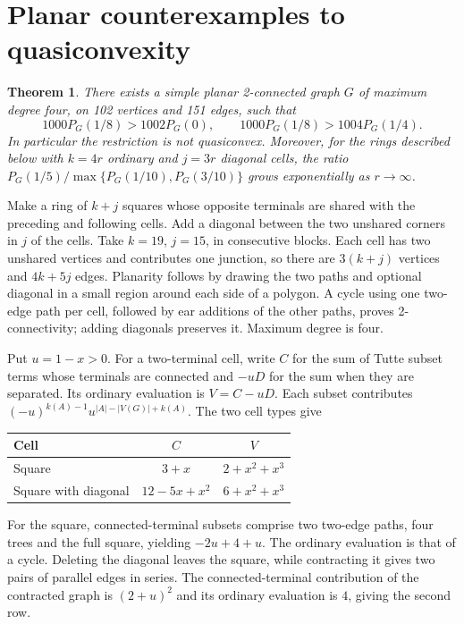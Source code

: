 \documentclass[11pt]{article}
\newtheorem{theorem}{Theorem}
\begin{document}
\section{Planar counterexamples to quasiconvexity}
\begin{theorem}\label{thm:planar}
There exists a simple planar 2-connected graph $G$ of maximum degree four, on 102 vertices and 151 edges, such that
\[
1000P_G(1/8)>1002P_G(0),\qquad 1000P_G(1/8)>1004P_G(1/4).
\]
In particular the restriction is not quasiconvex. Moreover, for the rings described below with $k=4r$ ordinary and $j=3r$ diagonal cells, the ratio $P_G(1/5)/\max\{P_G(1/10),P_G(3/10)\}$ grows exponentially as $r\to\infty$.
\end{theorem}
Make a ring of $k+j$ squares whose opposite terminals are shared with the preceding and following cells. Add a diagonal between the two unshared corners in $j$ of the cells. Take $k=19$, $j=15$, in consecutive blocks. Each cell has two unshared vertices and contributes one junction, so there are $3(k+j)$ vertices and $4k+5j$ edges. Planarity follows by drawing the two paths and optional diagonal in a small region around each side of a polygon. A cycle using one two-edge path per cell, followed by ear additions of the other paths, proves 2-connectivity; adding diagonals preserves it. Maximum degree is four.
\begin{center}
\end{center}
Put $u=1-x>0$. For a two-terminal cell, write $C$ for the sum of Tutte subset terms whose terminals are connected and $-uD$ for the sum when they are separated. Its ordinary evaluation is $V=C-uD$. Each subset contributes $(-u)^{k(A)-1}u^{|A|-|V(G)|+k(A)}$. The two cell types give
\begin{center}
\begin{tabular}{lcc}\toprule
Cell & $C$ & $V$\\\midrule
Square & $3+x$ & $2+x^2+x^3$\\
Square with diagonal & $12-5x+x^2$ & $6+x^2+x^3$\\\bottomrule
\end{tabular}
\end{center}
For the square, connected-terminal subsets comprise two two-edge paths, four trees and the full square, yielding $-2u+4+u$. The ordinary evaluation is that of a cycle. Deleting the diagonal leaves the square, while contracting it gives two pairs of parallel edges in series. The connected-terminal contribution of the contracted graph is $(2+u)^2$ and its ordinary evaluation is $4$, giving the second row.
\end{document}
